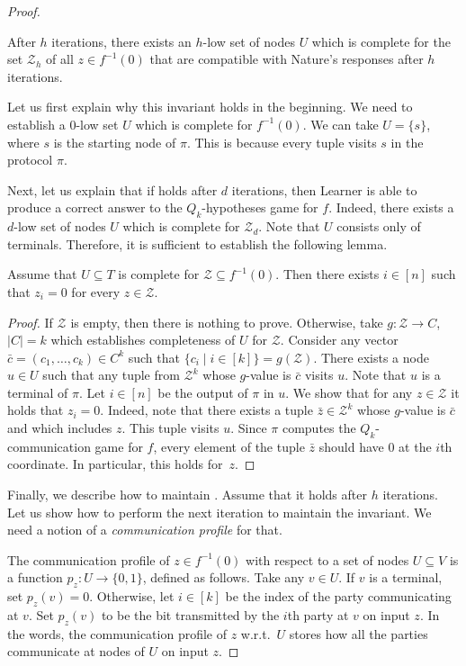 \begin{proof}
\begin{invariant}
\label{invar1}
After $h$ iterations, there exists an $h$-low set of nodes $U$ which is complete for the set $\mathcal{Z}_h$ of all $z\in f^{-1}(0)$ that are compatible with Nature's responses after $h$ iterations.
\end{invariant}
Let us first explain why this invariant holds in the beginning. We need to establish a $0$-low set $U$ which is complete for $f^{-1}(0)$. We can take $U = \{s\}$, where $s$ is the starting node of $\pi$. This is because every tuple visits $s$ in the protocol $\pi$.

Next, let us explain that if  holds after $d$ iterations, then Learner is able to produce a correct answer to the $Q_k$-hypotheses game for $f$. Indeed, there exists a $d$-low set of nodes $U$ which is complete for $\mathcal{Z}_d$. Note that $U$ consists only of terminals. Therefore, it is sufficient to establish the following lemma.

\begin{lemma}
\label{complete_lemma}
Assume that $U\subseteq T$ is complete for $\mathcal{Z} \subseteq f^{-1}(0)$. Then there exists $i\in [n]$ such that $z_i = 0$ for every $z\in\mathcal{Z}$.
\end{lemma}
\begin{proof}
If $\mathcal{Z}$ is empty, then there is nothing to prove. Otherwise, take $g\colon\mathcal{Z} \to C$, $|C| = k$ which establishes completeness of $U$ for $\mathcal{Z}$.  Consider any vector $\bar{c} = (c_1, \ldots, c_k) \in C^k$  such that $\{ c_i \mid i\in [k]\} = g(\mathcal{Z})$. There exists a node $u\in U$ such that any tuple from $\mathcal{Z}^k$  whose $g$-value is $\bar{c}$ visits $u$. Note that $u$ is a terminal of $\pi$. Let $i\in[n]$ be the output of $\pi$ in $u$. We show that for any $z\in\mathcal{Z}$ it holds that $z_i = 0$. Indeed, note that there exists a tuple  $\bar{z}\in\mathcal{Z}^k$  whose $g$-value is $\bar{c}$ and which includes $z$.  This tuple visits $u$. Since $\pi$ computes the $Q_k$-communication game for $f$, every element of the tuple $\bar{z}$ should have $0$ at the $i$th coordinate. In particular, this holds for~$z$.
\end{proof}
Finally, we describe how to maintain .
Assume that it holds after $h$ iterations. Let us show how to perform the next iteration to maintain the invariant. We need a notion of a \emph{communication profile} for that.

The communication profile of $z\in f^{-1}(0)$ with respect to a set of nodes $U\subseteq V$ is a function $p_z\colon U \to \{0, 1\}$, defined as follows. Take any $v\in U$. If $v$ is a terminal, set $p_z(v) = 0$. Otherwise, let $i\in [k]$ be the index of the party communicating at $v$. Set $p_z(v)$ to be the bit transmitted by the $i$th party at $v$ on input $z$. In the words, the communication profile of $z$ w.r.t.~$U$ stores how all the parties communicate at nodes of $U$ on input $z$.


\end{proof}

